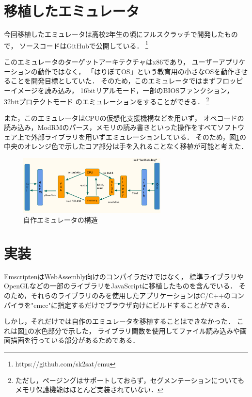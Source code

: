 \documentclass[a4j,10pt]{jsarticle}
\begin{document}
\section{移植したエミュレータ}
今回移植したエミュレータは高校2年生の頃にフルスクラッチで開発したもので，
ソースコードはGitHubで公開している．
\footnote{https://github.com/sk2sat/emu}

このエミュレータのターゲットアーキテクチャはx86であり，
ユーザーアプリケーションの動作ではなく，
「はりぼてOS」という教育用の小さなOSを動作させることを開発目標としていた．
そのため，このエミュレータではまずフロッピーイメージを読み込み，
16bitリアルモード，一部のBIOSファンクション，32bitプロテクトモード
のエミュレーションをすることができる．
\footnote{ただし，ページングはサポートしておらず，セグメンテーションについてもメモリ保護機能はほとんど実装されていない．}

また，このエミュレータはCPUの仮想化支援機構などを用いず，
オペコードの読み込み，ModRMのパース，メモリの読み書きといった操作をすべてソフトウェア上で外部ライブラリを用いずエミュレーションしている．
そのため，図\ref{struct}の中央のオレンジ色で示したコア部分は手を入れることなく移植が可能と考えた．

\begin{figure}[htbp]
	\begin{center}
		\includegraphics[width=7.5cm]{./emu_struct.png}
		\caption{自作エミュレータの構造}
		\label{struct}
	\end{center}
\end{figure}

\section{実装}
EmscriptenはWebAssembly向けのコンパイラだけではなく，
標準ライブラリやOpenGLなどの一部のライブラリをJavaScriptに移植したものを含んでいる．
そのため，それらのライブラリのみを使用したアプリケーションはC/C++のコンパイラを"emcc"に指定するだけでブラウザ向けにビルドすることができる．

しかし，それだけでは自作のエミュレータを移植することはできなかった．
これは図\ref{struct}の水色部分で示した，
ライブラリ関数を使用してファイル読み込みや画面描画を行っている部分があるためである．
\end{document}
